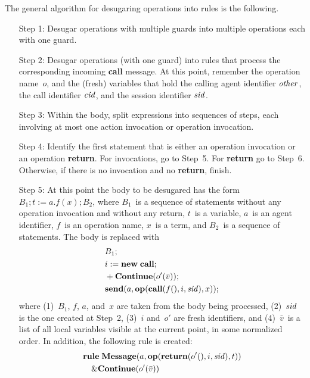\documentclass[a4paper,12pt,oneside,fleqn]{book} %
\begin{document}
The general algorithm for desugaring operations into rules is the
following.
\begin{itemize}
\item[Step 1:]
  Desugar operations with multiple guards into multiple operations each
  with one guard.
\item[Step 2:]
  Desugar operations (with one guard) into rules that process the
  corresponding incoming {\bf call} message. At this point, remember the
  operation name~$o$, and the (fresh) variables that hold the calling agent
  identifier $\it other$, the call identifier $\it cid$, and the session
  identifier $\it sid$.
\item[Step 3:]
  Within the body, split expressions into sequences of steps, each
  involving at most one action invocation or operation invocation.
\item[Step 4:]
  Identify the first statement that is either an operation invocation or an
  operation {\bf return}. For invocations, go to Step~5. For {\bf return}
  go to Step~6. Otherwise, if there is no invocation and no {\bf return},
  finish.
\item[Step 5:]
  At this point the body to be desugared has the form $B_1;t:=a.f(x); B_2$,
  where $B_1$~is a sequence of statements without any operation invocation
  and without any return, $t$~is a variable, $a$~is an agent identifier,
  $f$~is an operation name, $x$~is a term, and $B_2$~is a sequence of
  statements. The body is replaced with
\begin{align}
\begin{aligned}
&B_1; \\
&i:={\bf new}\;{\bf call}; \\
&+{\bf Continue}(o'(\bar v)); \\
&{\bf send}(a, {\bf op}({\bf call}(f(), i, {\it sid}), x));
\end{aligned}
\end{align}
  where (1)~$B_1$, $f$, $a$, and~$x$ are taken from the body being
  processed, (2)~$\it sid$ is the one created at Step~2, (3)~$i$ and~$o'$
  are fresh identifiers, and (4)~$\bar v$~is a list of all local variables
  visible at the current point, in some normalized order. In addition, the
  following rule is created:
\begin{align}
\begin{aligned}
&{\bf rule}\;{\bf Message}(a,{\bf op}({\bf return}(o'(),i,{\it sid}), t))\\
&\quad\& {\bf Continue}(o'(\bar v))\\

\end{aligned}
\end{align}
\end{itemize}
\end{document}
